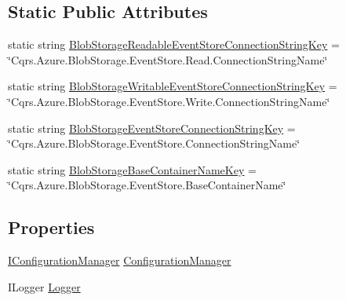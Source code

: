 \subsection*{Static Public Attributes}
\begin{DoxyCompactItemize}
\item 
static string \hyperlink{classCqrs_1_1Azure_1_1BlobStorage_1_1Events_1_1BlobStorageEventStoreConnectionStringFactory_a2b233edf7ad4cbc29872757006319527}{Blob\+Storage\+Readable\+Event\+Store\+Connection\+String\+Key} = \char`\"{}Cqrs.\+Azure.\+Blob\+Storage.\+Event\+Store.\+Read.\+Connection\+String\+Name\char`\"{}
\item 
static string \hyperlink{classCqrs_1_1Azure_1_1BlobStorage_1_1Events_1_1BlobStorageEventStoreConnectionStringFactory_a3bf39254f211e4fbcbd9bc108c8d9fbc}{Blob\+Storage\+Writable\+Event\+Store\+Connection\+String\+Key} = \char`\"{}Cqrs.\+Azure.\+Blob\+Storage.\+Event\+Store.\+Write.\+Connection\+String\+Name\char`\"{}
\item 
static string \hyperlink{classCqrs_1_1Azure_1_1BlobStorage_1_1Events_1_1BlobStorageEventStoreConnectionStringFactory_a36edb24cf0ef60114fc344b5d0bb619d}{Blob\+Storage\+Event\+Store\+Connection\+String\+Key} = \char`\"{}Cqrs.\+Azure.\+Blob\+Storage.\+Event\+Store.\+Connection\+String\+Name\char`\"{}
\item 
static string \hyperlink{classCqrs_1_1Azure_1_1BlobStorage_1_1Events_1_1BlobStorageEventStoreConnectionStringFactory_affd6198f87e483bd7a6f5930a5eaa431}{Blob\+Storage\+Base\+Container\+Name\+Key} = \char`\"{}Cqrs.\+Azure.\+Blob\+Storage.\+Event\+Store.\+Base\+Container\+Name\char`\"{}
\end{DoxyCompactItemize}
\subsection*{Properties}
\begin{DoxyCompactItemize}
\item 
\hyperlink{interfaceCqrs_1_1Configuration_1_1IConfigurationManager}{I\+Configuration\+Manager} \hyperlink{classCqrs_1_1Azure_1_1BlobStorage_1_1Events_1_1BlobStorageEventStoreConnectionStringFactory_adefd82b19551d994e27ce92bb0f0103d}{Configuration\+Manager}
\item 
I\+Logger \hyperlink{classCqrs_1_1Azure_1_1BlobStorage_1_1Events_1_1BlobStorageEventStoreConnectionStringFactory_a3149133c39d832a1ea78542bae2a9c2a}{Logger}
\end{DoxyCompactItemize}


